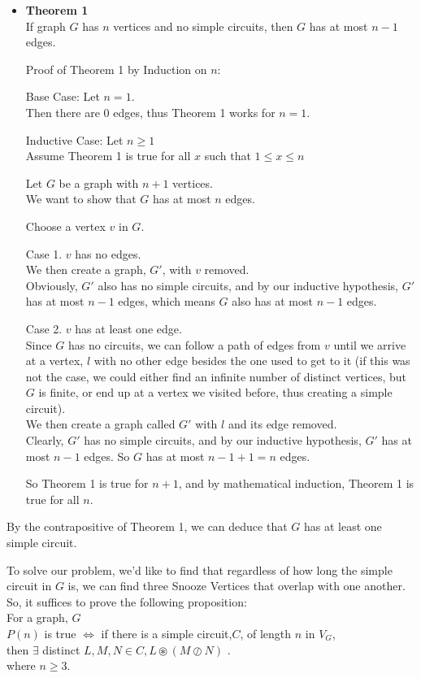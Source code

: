 \documentclass[fleqn]{article}
\begin{document}
\begin{itemize}
\item
\textbf{Theorem 1}\\
If graph $G$ has $n$ vertices and no simple circuits,
then $G$ has at most $n-1$ edges.

Proof of Theorem 1 by Induction on $n$:

Base Case: Let $n = 1$.\\
Then there are 0 edges, thus Theorem 1 works for $n=1$.

Inductive Case: Let $n \geq 1$\\
Assume Theorem 1 is true for all $x$ such that $1 \leq x \leq n$

Let $G$ be a graph with $n+1$ vertices.\\
We want to show that $G$ has at most $n$ edges.

Choose a vertex $v$ in $G$.

Case 1. $v$ has no edges.\\
We then create a graph, $G'$, with $v$ removed.\\
Obviously, $G'$ also has no simple circuits, and by our inductive hypothesis, $G'$ has at most $n-1$ edges, which means $G$ also has at most $n-1$ edges.

Case 2. $v$ has at least one edge.\\
Since $G$ has no circuits, we can follow a path of edges from $v$ until we arrive at a vertex, $l$ with no other edge besides the one used to get to it (if this was not the case, we could either find an infinite number of distinct vertices, but $G$ is finite, or end up at a vertex we visited before, thus creating a simple circuit).\\
We then create a graph called $G'$ with $l$ and its edge removed.
\\Clearly, $G'$ has no simple circuits, and by our inductive hypothesis, $G'$ has at most $n-1$ edges. So $G$ has at most $n-1+1=n$ edges.


So Theorem 1 is true for $n+1$, and by mathematical induction, Theorem 1 is true for all $n$.
\end{itemize} 
By the contrapositive of Theorem 1, we can deduce that $G$ has at least one simple circuit.

To solve our problem, we'd like to find that regardless of how long the simple circuit in $G$ is, we can find three Snooze Vertices that overlap with one another.\\
So, it suffices to prove the following proposition:\\
For a graph, $G$\\
$P(n)$ is true $\Leftrightarrow$ if there is a simple circuit,$C$, of length $n$ in $V_G$,\\ then $\exists$ distinct $ L,M,N \in C,
                       L \circledast (M \oslash N)$ .\\
where $n \geq 3$.
\end{document}
